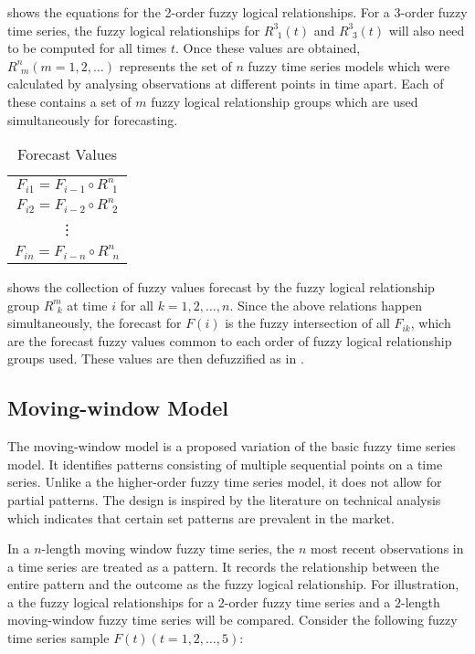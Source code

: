 \documentclass[12pt, oneside, a4paper]{article}
\theoremstyle{definition}
\begin{document}
 shows the equations for the 2-order fuzzy logical relationships. For a 3-order fuzzy time series, the fuzzy logical relationships for $R^{3}_{\ \ 1}(t)$ and $R^{3}_{\ \ 3}(t)$ will also need to be computed for all times $t$. Once these values are obtained, $R^{n}_{\ \ m}(m=1,2,\ldots)$ represents the set of $n$ fuzzy time series models which were calculated by analysing observations at different points in time apart. Each of these contains a set of $m$ fuzzy logical relationship groups which are used simultaneously for forecasting. 

\begin{table}[H]
	\center
	\begin{tabular}{ c }
	\hline
  	$F_{i1} = F_{i-1} \circ R^{n}_{\ \ 1}$ \\
  	$F_{i2} = F_{i-2} \circ R^{n}_{\ \ 2}$ \\
  	\vdots \\
  	$F_{in} = F_{i-n} \circ R^{n}_{\ \ n}$ \\
  	\hline
	\end{tabular}
	\caption{Forecast Values}
	\label{forecasting}
\end{table}

 shows the collection of fuzzy values forecast by the fuzzy logical relationship group $R^{m}_{\ \ k}$ at time $i$ for all $k=1,2,\ldots,n$. Since the above relations happen simultaneously, the forecast for $F(i)$ is the fuzzy intersection of all $F_{ik}$, which are the forecast fuzzy values common to each order of fuzzy logical relationship groups used. These values are then defuzzified as in .

\subsection{Moving-window Model}

The moving-window model is a proposed variation of the basic fuzzy time series model. It identifies patterns consisting of multiple sequential points on a time series. Unlike a the higher-order fuzzy time series model, it does not allow for partial patterns. The design is inspired by the literature on technical analysis which indicates that certain set patterns are prevalent in the market.

In a $n$-length moving window fuzzy time series, the $n$ most recent observations in a time series are treated as a pattern. It records the relationship between the entire pattern and the outcome as the fuzzy logical relationship. For illustration, a the fuzzy logical relationships for a $2$-order fuzzy time series and a $2$-length moving-window fuzzy time series will be compared. Consider the following fuzzy time series sample $F(t)(t=1,2,\ldots,5)$:
\end{document}
